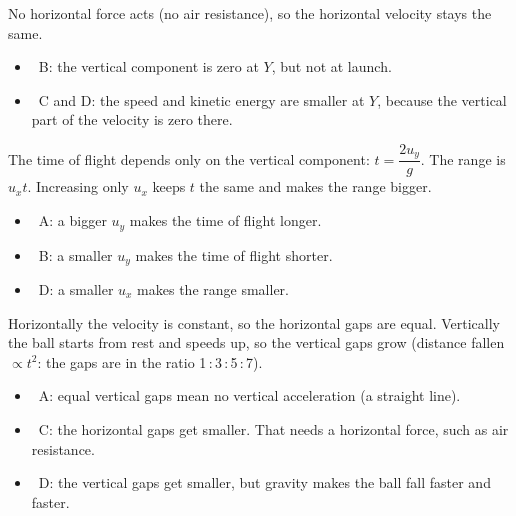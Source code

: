 \documentclass[12pt]{article}
\begin{document}
\begin{practiceanswers}
\begin{practiceans}
  No horizontal force acts (no air resistance), so the horizontal velocity stays the same.
  \begin{itemize}
    \item \xmark\ B: the vertical component is zero at $Y$, but not at launch.
    \item \xmark\ C and D: the speed and kinetic energy are smaller at $Y$, because the vertical part
          of the velocity is zero there.
  \end{itemize}
\end{practiceans}

\begin{practiceans}
  The time of flight depends only on the vertical component: $t = \dfrac{2u_y}{g}$. The range is
  $u_x t$. Increasing only $u_x$ keeps $t$ the same and makes the range bigger.
  \begin{itemize}
    \item \xmark\ A: a bigger $u_y$ makes the time of flight longer.
    \item \xmark\ B: a smaller $u_y$ makes the time of flight shorter.
    \item \xmark\ D: a smaller $u_x$ makes the range smaller.
  \end{itemize}
\end{practiceans}

\begin{practiceans}
  Horizontally the velocity is constant, so the horizontal gaps are equal. Vertically the ball
  starts from rest and speeds up, so the vertical gaps grow (distance fallen $\propto t^2$: the gaps
  are in the ratio 1\,:\,3\,:\,5\,:\,7).
  \begin{itemize}
    \item \xmark\ A: equal vertical gaps mean no vertical acceleration (a straight line).
    \item \xmark\ C: the horizontal gaps get smaller. That needs a horizontal force, such as air
          resistance.
    \item \xmark\ D: the vertical gaps get smaller, but gravity makes the ball fall faster and faster.
  \end{itemize}
\end{practiceans}


\end{practiceanswers}
\end{document}
